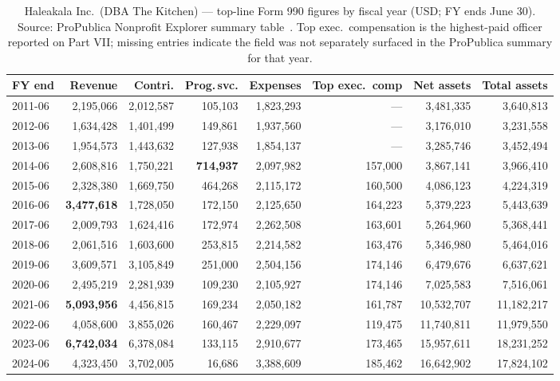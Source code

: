 \documentclass[10pt,letterpaper,twocolumn]{article}
\begin{document}
\begin{table}[t]
\footnotesize
\centering
\setlength{\tabcolsep}{4pt}
\begin{tabularx}{\textwidth}{Xrrrrrrr}
\toprule
\textbf{FY end} & \textbf{Revenue} & \textbf{Contri.} & \textbf{Prog.\,svc.} & \textbf{Expenses} & \textbf{Top exec.~comp} & \textbf{Net assets} & \textbf{Total assets} \\
\midrule
2011-06 & 2,195,066 & 2,012,587 & 105,103 & 1,823,293 & --- & 3,481,335 & 3,640,813 \\
2012-06 & 1,634,428 & 1,401,499 & 149,861 & 1,937,560 & --- & 3,176,010 & 3,231,558 \\
2013-06 & 1,954,573 & 1,443,632 & 127,938 & 1,854,137 & --- & 3,285,746 & 3,452,494 \\
2014-06 & 2,608,816 & 1,750,221 & \textbf{714,937} & 2,097,982 & 157,000 & 3,867,141 & 3,966,410 \\
2015-06 & 2,328,380 & 1,669,750 & 464,268 & 2,115,172 & 160,500 & 4,086,123 & 4,224,319 \\
2016-06 & \textbf{3,477,618} & 1,728,050 & 172,150 & 2,125,650 & 164,223 & 5,379,223 & 5,443,639 \\
2017-06 & 2,009,793 & 1,624,416 & 172,974 & 2,262,508 & 163,601 & 5,264,960 & 5,368,441 \\
2018-06 & 2,061,516 & 1,603,600 & 253,815 & 2,214,582 & 163,476 & 5,346,980 & 5,464,016 \\
2019-06 & 3,609,571 & 3,105,849 & 251,000 & 2,504,156 & 174,146 & 6,479,676 & 6,637,621 \\
2020-06 & 2,495,219 & 2,281,939 & 109,230 & 2,105,927 & 174,146 & 7,025,583 & 7,516,061 \\
2021-06 & \textbf{5,093,956} & 4,456,815 & 169,234 & 2,050,182 & 161,787 & 10,532,707 & 11,182,217 \\
2022-06 & 4,058,600 & 3,855,026 & 160,467 & 2,229,097 & 119,475 & 11,740,811 & 11,979,550 \\
2023-06 & \textbf{6,742,034} & 6,378,084 & 133,115 & 2,910,677 & 173,465 & 15,957,611 & 18,231,252 \\
2024-06 & 4,323,450 & 3,702,005 & 16,686 & 3,388,609 & 185,462 & 16,642,902 & 17,824,102 \\
\bottomrule
\end{tabularx}
\caption{Haleakala Inc.~(DBA The Kitchen) --- top-line Form 990 figures by fiscal year (USD; FY ends June 30). Source: ProPublica Nonprofit Explorer summary table~\citep{propublica_kitchen}. Top exec.~compensation is the highest-paid officer reported on Part VII; missing entries indicate the field was not separately surfaced in the ProPublica summary for that year.}
\label{tab:financials}
\end{table}
\end{document}
